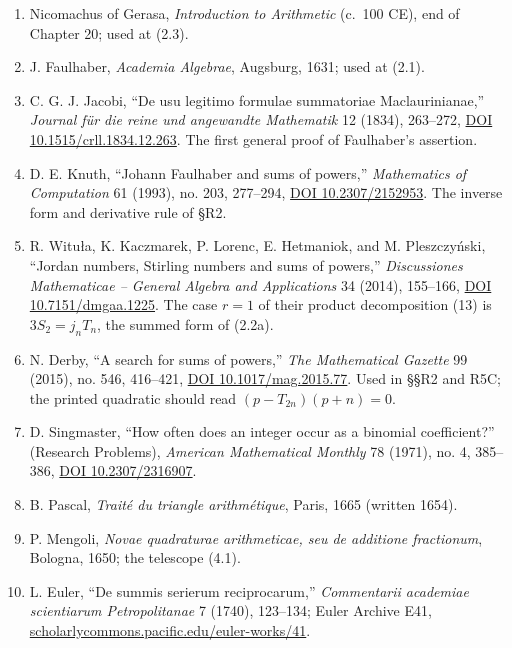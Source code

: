 \documentclass[
  11pt,
]{book}
\providecommand{\tightlist}{%
  \setlength{\itemsep}{0pt}\setlength{\parskip}{0pt}}
\begin{document}
\begin{enumerate}
\def\labelenumi{\arabic{enumi}.}
\setcounter{enumi}{82}
\tightlist
\item
  Nicomachus of Gerasa, \emph{Introduction to Arithmetic} (c.~100 CE),
  end of Chapter 20; used at (2.3).
\item
  J. Faulhaber, \emph{Academia Algebrae}, Augsburg, 1631; used at (2.1).
\item
  C. G. J. Jacobi, ``De usu legitimo formulae summatoriae
  Maclaurinianae,'' \emph{Journal für die reine und angewandte
  Mathematik} 12 (1834), 263--272,
  \href{https://doi.org/10.1515/crll.1834.12.263}{DOI
  10.1515/crll.1834.12.263}. The first general proof of Faulhaber's
  assertion.
\item
  D. E. Knuth, ``Johann Faulhaber and sums of powers,''
  \emph{Mathematics of Computation} 61 (1993), no. 203, 277--294,
  \href{https://doi.org/10.2307/2152953}{DOI 10.2307/2152953}. The
  inverse form and derivative rule of §R2.
\item
  R. Wituła, K. Kaczmarek, P. Lorenc, E. Hetmaniok, and M. Pleszczyński,
  ``Jordan numbers, Stirling numbers and sums of powers,''
  \emph{Discussiones Mathematicae -- General Algebra and Applications}
  34 (2014), 155--166, \href{https://doi.org/10.7151/dmgaa.1225}{DOI
  10.7151/dmgaa.1225}. The case \(r=1\) of their product decomposition
  (13) is \(3S_2=j_nT_n\), the summed form of (2.2a).
\item
  N. Derby, ``A search for sums of powers,'' \emph{The Mathematical
  Gazette} 99 (2015), no. 546, 416--421,
  \href{https://doi.org/10.1017/mag.2015.77}{DOI 10.1017/mag.2015.77}.
  Used in §§R2 and R5C; the printed quadratic should read
  \((p-T_{2n})(p+n)=0\).
\item
  D. Singmaster, ``How often does an integer occur as a binomial
  coefficient?'' (Research Problems), \emph{American Mathematical
  Monthly} 78 (1971), no. 4, 385--386,
  \href{https://doi.org/10.2307/2316907}{DOI 10.2307/2316907}.
\item
  B. Pascal, \emph{Traité du triangle arithmétique}, Paris, 1665
  (written 1654).
\item
  P. Mengoli, \emph{Novae quadraturae arithmeticae, seu de additione
  fractionum}, Bologna, 1650; the telescope (4.1).
\item
  L. Euler, ``De summis serierum reciprocarum,'' \emph{Commentarii
  academiae scientiarum Petropolitanae} 7 (1740), 123--134; Euler
  Archive E41,
  \href{https://scholarlycommons.pacific.edu/euler-works/41/}{scholarlycommons.pacific.edu/euler-works/41}.

\end{enumerate}
\end{document}
